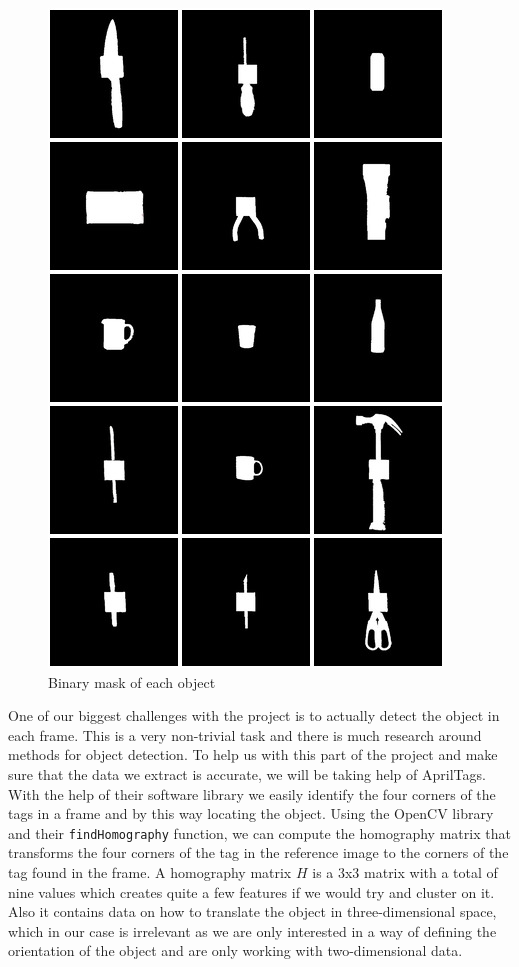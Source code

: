 \begin{figure}
	\centering
	\includegraphics[width=\textwidth]{img/methods/masks.jpg}
	\caption{Binary mask of each object}
	\label{fig:masks_montage}
\end{figure}

One of our biggest challenges with the project is to actually detect the object in each frame. This is a very non-trivial task and there is much research around methods for object detection. To help us with this part of the project and make sure that the data we extract is accurate, we will be taking help of AprilTags. With the help of their software library we easily identify the four corners of the tags in a frame and by this way locating the object. Using the OpenCV library and their \texttt{findHomography} function, we can compute the homography matrix that transforms the four corners of the tag in the reference image to the corners of the tag found in the frame. A homography matrix \(H\) is a 3x3 matrix with a total of nine values which creates quite a few features if we would try and cluster on it. Also it contains data on how to translate the object in three-dimensional space, which in our case is irrelevant as we are only interested in a way of defining the orientation of the object and are only working with two-dimensional data.

